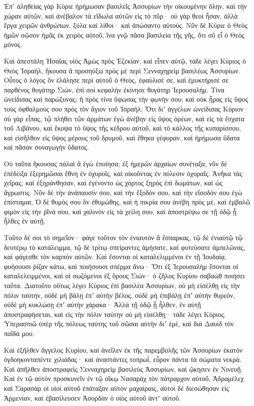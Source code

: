 {Ἐπʼ ἀληθείας γὰρ Κύριε ἠρήμωσαν βασιλεῖς Ἀσσυρίων τὴν οἰκουμένην ὅλην, καὶ τὴν χώραν αὐτῶν,
καὶ ἀνέβαλον τὰ εἴδωλα αὐτῶν εἰς τὸ πῦρ· οὐ γὰρ θεοὶ ἦσαν, ἀλλὰ ἔργα χειρῶν ἀνθρώπων, ξύλα καὶ λίθοι· καὶ ἀπώσαντο αὐτούς.
Νῦν δὲ Κύριε ὁ Θεὸς ἡμῶν σῶσον ἡμᾶς ἐκ χειρὸς αὐτοῦ, ἵνα γνῷ πᾶσα βασιλεία τῆς γῆς, ὅτι σῦ εἶ ὁ Θεὸς μόνος.
\par }{\PP {}Καὶ ἀπεστάλη Ἡσαΐας υἱὸς Ἀμὼς πρὸς Ἐζεκίαν, καὶ εἶπεν αὐτῷ, τάδε λέγει Κύριος ὁ Θεὸς Ἰσραὴλ, ἤκουσα ἃ προσηύξω πρὸς μὲ περὶ Σενναχηρεὶμ βασιλέως Ἀσσυρίων.
Οὗτος ὁ λόγος ὃν ἐλάλησε περὶ αὐτοῦ ὁ Θεὸς, ἐφαύλισέ σε, καὶ ἐμυκτήρισέ σε παρθένος θυγάτηρ Σιὼν, ἐπὶ σοὶ κεφαλὴν ἐκίνησε θυγάτηρ Ἱερουσαλήμ.
Τίνα ὠνείδισας καὶ παρώξυνας; ἢ πρὸς τίνα ὕψωσας τὴν φωνήν σου; καὶ οὐκ ᾖρας εἰς ὕψος τοὺς ὀφθαλμούς σου πρὸς τὸν ἅγιον τοῦ Ἰσραήλ;
Ὅτι διʼ ἀγγέλων ὠνείδισας Κύριον· σὺ γὰρ εἶπας, τῷ πλήθει τῶν ἁρμάτων ἐγὼ ἀνέβην εἰς ὕψος ὀρέων, καὶ εἰς τὰ ἔσχατα τοῦ Λιβάνου, καὶ ἔκοψα τὸ ὕψος τῆς κέδρου αὐτοῦ, καὶ τὸ κάλλος τῆς κυπαρίσσου, καὶ εἰσῆλθον εἰς ὕψος μέρους τοῦ δρυμοῦ,
καὶ ἔθηκα γέφυραν, καὶ ἠρήμωσα ὕδατα καὶ πᾶσαν συναγωγὴν ὕδατος.
\par }{\PP {}Οὐ ταῦτα ἤκουσας πάλαὶ ἃ ἐγὼ ἐποίησα; ἐξ ἡμερῶν ἀρχαίων συνέταξα, νῦν δὲ ἐπέδειξα ἐξερημῶσαι ἔθνη ἐν ὀχυροῖς, καὶ οἰκοῦντας ἐν πόλεσιν ὀχυραῖς.
Ἀνῆκα τὰς χεῖρας, καὶ ἐξηράνθησαν, καὶ ἐγένοντο ὡς χόρτος ξηρὸς ἐπὶ δωμάτων, καὶ ὡς ἄγρωστις.
Νῦν δὲ τὴν ἀνάπαυσίν σου, καὶ τὴν ἔξοδόν σου, καὶ τὴν εἴσοδόν σου ἐγὼ ἐπίσταμαι.
Ὁ δὲ θυμός σου ὃν ἐθυμώθης, καὶ ἡ πικρία σου ἀνέβη πρὸς μὲ, καὶ ἐμβαλῶ φιμὸν εἰς τὴν ῥῖνά σου, καὶ χαλινὸν εἰς τὰ χείλη σου, καὶ ἀποστρέψω σε τῇ ὁδῷ ᾗ ἦλθες ἐν αὐτῇ.
\par }{\PP {}Τοῦτο δέ σοι τὸ σημεῖον· φάγε τοῦτον τὸν ἐνιαυτὸν ἃ ἔσπαρκας, τῷ δὲ ἐνιαὐτῷ τῷ δευτέρῳ τὸ κατάλειμμα, τῷ δὲ τρίτῳ σπείραντες ἀμήσατε, καὶ φυτεύσατε ἀμπελῶνας, καὶ φάγεσθε τὸν καρπὸν αὐτῶν.
Καὶ ἔσονται οἱ καταλελιμμένοι ἐν τῇ Ἰουδαίᾳ, φυήσουσι ῥίζαν κάτω, καὶ ποιήσουσι σπέρμα ἄνω·
Ὅτι ἐξ Ἱερουσαλὴμ ἔσονται οἱ καταλελειμμένοι, καὶ οἱ σωζόμενοι ἐξ ὄρους Σιών· ὁ ζῆλος Κυρίου σαβαὼθ ποιήσει ταῦτα.
Διατοῦτο οὕτως λέγει Κύριος ἐπὶ βασιλέα Ἀσσυρίων, οὐ μὴ εἰσέλθῃ εἰς τὴν πόλιν ταύτην, οὐδὲ μὴ βάλῃ ἐπʼ αὐτὴν βέλος, οὐδὲ μὴ ἐπιβάλῃ ἐπʼ αὐτὴν θυρεὸν, οὐδὲ μὴ κυκλώσῃ ἐπʼ αὐτὴν χάρακα·
Ἀλλὰ τῇ ὁδῷ ᾗ ἦλθεν, ἐν αὐτῇ ἀποστραφήσεται, καὶ εἰς τὴν πόλιν ταύτην οὐ μὴ εἰσέλθῃ· τάδε λέγει Κύριος.
Ὑπερασπιῶ ὑπὲρ τῆς πόλεως ταύτης τοῦ σῶσαι αὐτὴν διʼ ἐμὲ, καὶ διὰ Δαυὶδ τὸν παῖδά μου.
\par }{\PP {}Καὶ ἐξῆλθεν ἄγγελος Κυρίου, καὶ ἀνεῖλεν ἐκ τῆς παρεμβολῆς τῶν Ἀσσυρίων ἑκατὸν ὀγδοηκονταπέντε χιλιάδας· καὶ ἀναστάντες τοπρωῒ, εὗρον πάντα τὰ σώματα νεκρά.
Καὶ ἀπῆλθεν ἀποστραφεὶς Σενναχηρεὶμ βασιλεὺς Ἀσσυρίων, καὶ ᾤκησεν ἐν Νινευῇ.
Καὶ ἐν τῷ αὐτὸν προσκυνεῖν ἐν τῷ οἴκῳ Νασαρὰχ τὸν πάτραρχον αὐτοῦ, Ἀδραμέλεχ καὶ Σαρασὰρ οἱ υἱοὶ αὐτοῦ ἐπάταξαν αὐτὸν μαχαίραις, αὐτοὶ δὲ διεσώθησαν εἰς Ἀρμενίαν, καὶ ἐβασίλευσεν Ἀσορδὰν ὁ υἱὸς αὐτοῦ ἀντʼ αὐτοῦ.

}
